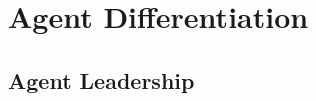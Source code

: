 \section{Agent Differentiation}
\label{sec:agent-differentiation}

\subsection{Agent Leadership}
\label{sec:agent-leadership}

